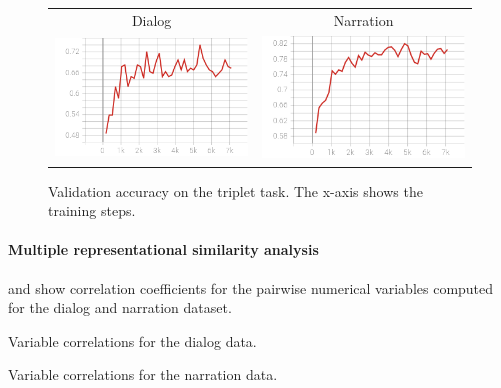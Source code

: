 \begin{figure}
  \centering
  \begin{tabular}{cc}
    Dialog & Narration \\
    \includegraphics[scale=0.3]{val_acc3.png}  & \includegraphics[scale=0.3]{valnarr_acc3.png}\\
  \end{tabular}
  \caption{Validation accuracy on the triplet task. The x-axis shows
    the training steps.}
  \label{fig:triplet}
\end{figure}

\paragraph{Multiple representational similarity analysis}

 and 
show correlation coefficients for the pairwise numerical variables
computed for the  dialog and narration dataset. 

\begin{table}
  \centering

\caption{Variable correlations for the dialog data.}
  \label{tab:dialog-cor}
\end{table}
\begin{table}
  \centering

\caption{Variable correlations for the narration data.}
  \label{tab:narration-cor}
\end{table}


